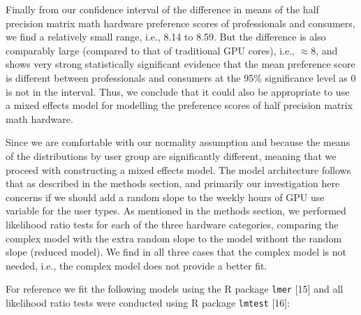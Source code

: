 \documentclass[
]{article}
\begin{document}
Finally from our confidence interval of the difference in means of the
half precision matrix math hardware preference scores of professionals
and consumers, we find a relatively small range, i.e., 8.14 to 8.59. But
the difference is also comparably large (compared to that of traditional
GPU cores), i.e., \(\approx 8\), and shows very strong statistically
significant evidence that the mean preference score is different between
professionals and consumers at the 95\% significance level as 0 is not
in the interval. Thus, we conclude that it could also be appropriate to
use a mixed effects model for modelling the preference scores of half
precision matrix math hardware.

Since we are comfortable with our normality assumption and because the
means of the distributions by user group are significantly different,
meaning that we proceed with constructing a mixed effects model. The
model architecture follows that as described in the methods section, and
primarily our investigation here concerns if we should add a random
slope to the weekly hours of GPU use variable for the user types. As
mentioned in the methods section, we performed likelihood ratio tests
for each of the three hardware categories, comparing the complex model
with the extra random slope to the model without the random slope
(reduced model). We find in all three cases that the complex model is
not needed, i.e., the complex model does not provide a better fit.

For reference we fit the following models using the R package
\texttt{lmer} {[}15{]} and all likelihood ratio tests were conducted
using R package \texttt{lmtest} {[}16{]}:
\end{document}
